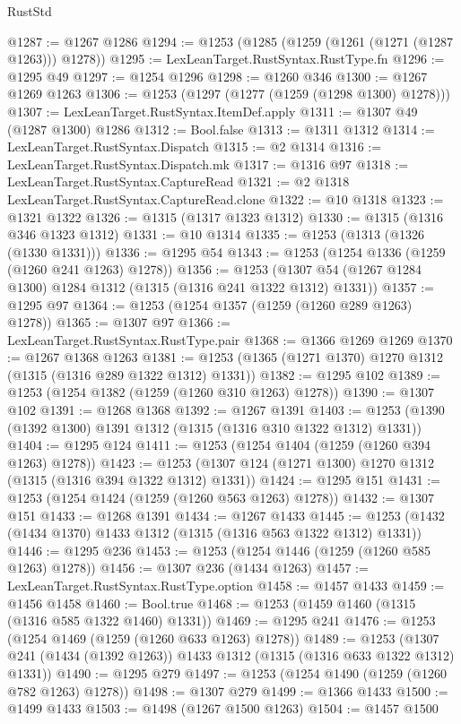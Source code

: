 \begin{lexlean}{RustStd}
\begin{coremodule}
@1287 := @1267 @1286
@1294 := @1253 (@1285 (@1259 (@1261 (@1271 (@1287 @1263))) @1278))
@1295 := LexLeanTarget.RustSyntax.RustType.fn
@1296 := @1295 @49
@1297 := @1254 @1296
@1298 := @1260 @346
@1300 := @1267 @1269 @1263
@1306 := @1253 (@1297 (@1277 (@1259 (@1298 @1300) @1278)))
@1307 := LexLeanTarget.RustSyntax.ItemDef.apply
@1311 := @1307 @49 (@1287 @1300) @1286
@1312 := Bool.false
@1313 := @1311 @1312
@1314 := LexLeanTarget.RustSyntax.Dispatch
@1315 := @2 @1314
@1316 := LexLeanTarget.RustSyntax.Dispatch.mk
@1317 := @1316 @97
@1318 := LexLeanTarget.RustSyntax.CaptureRead
@1321 := @2 @1318 LexLeanTarget.RustSyntax.CaptureRead.clone
@1322 := @10 @1318
@1323 := @1321 @1322
@1326 := @1315 (@1317 @1323 @1312)
@1330 := @1315 (@1316 @346 @1323 @1312)
@1331 := @10 @1314
@1335 := @1253 (@1313 (@1326 (@1330 @1331)))
@1336 := @1295 @54
@1343 := @1253 (@1254 @1336 (@1259 (@1260 @241 @1263) @1278))
@1356 := @1253 (@1307 @54 (@1267 @1284 @1300) @1284 @1312 (@1315 (@1316 @241 @1322 @1312) @1331))
@1357 := @1295 @97
@1364 := @1253 (@1254 @1357 (@1259 (@1260 @289 @1263) @1278))
@1365 := @1307 @97
@1366 := LexLeanTarget.RustSyntax.RustType.pair
@1368 := @1366 @1269 @1269
@1370 := @1267 @1368 @1263
@1381 := @1253 (@1365 (@1271 @1370) @1270 @1312 (@1315 (@1316 @289 @1322 @1312) @1331))
@1382 := @1295 @102
@1389 := @1253 (@1254 @1382 (@1259 (@1260 @310 @1263) @1278))
@1390 := @1307 @102
@1391 := @1268 @1368
@1392 := @1267 @1391
@1403 := @1253 (@1390 (@1392 @1300) @1391 @1312 (@1315 (@1316 @310 @1322 @1312) @1331))
@1404 := @1295 @124
@1411 := @1253 (@1254 @1404 (@1259 (@1260 @394 @1263) @1278))
@1423 := @1253 (@1307 @124 (@1271 @1300) @1270 @1312 (@1315 (@1316 @394 @1322 @1312) @1331))
@1424 := @1295 @151
@1431 := @1253 (@1254 @1424 (@1259 (@1260 @563 @1263) @1278))
@1432 := @1307 @151
@1433 := @1268 @1391
@1434 := @1267 @1433
@1445 := @1253 (@1432 (@1434 @1370) @1433 @1312 (@1315 (@1316 @563 @1322 @1312) @1331))
@1446 := @1295 @236
@1453 := @1253 (@1254 @1446 (@1259 (@1260 @585 @1263) @1278))
@1456 := @1307 @236 (@1434 @1263)
@1457 := LexLeanTarget.RustSyntax.RustType.option
@1458 := @1457 @1433
@1459 := @1456 @1458
@1460 := Bool.true
@1468 := @1253 (@1459 @1460 (@1315 (@1316 @585 @1322 @1460) @1331))
@1469 := @1295 @241
@1476 := @1253 (@1254 @1469 (@1259 (@1260 @633 @1263) @1278))
@1489 := @1253 (@1307 @241 (@1434 (@1392 @1263)) @1433 @1312 (@1315 (@1316 @633 @1322 @1312) @1331))
@1490 := @1295 @279
@1497 := @1253 (@1254 @1490 (@1259 (@1260 @782 @1263) @1278))
@1498 := @1307 @279
@1499 := @1366 @1433
@1500 := @1499 @1433
@1503 := @1498 (@1267 @1500 @1263)
@1504 := @1457 @1500

\end{coremodule}
\end{lexlean}
